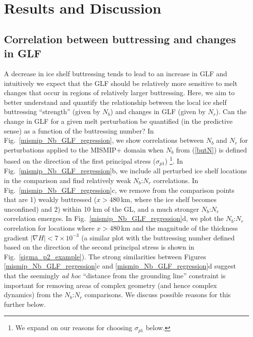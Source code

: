 \documentclass[tc, manuscript]{copernicus}
\begin{document}
\section{Results and Discussion}

\subsection{Correlation between buttressing and changes in GLF}

A decrease in ice shelf buttressing tends to lead to an increase in GLF \citep[e.g.,][]{gagliardini2010} and intuitively we expect that the GLF should be relatively more sensitive to melt changes that occur in regions of relatively larger buttressing. Here, we aim to better understand and quantify the relationship between the local ice shelf buttressing ``strength'' (given by $N_b$) and changes in GLF (given by $N_r$). Can the change in GLF for a given melt perturbation be quantified (in the predictive sense) as a function of the buttressing number? In Fig.~\ref{mismip_Nb_GLF_regression}, we show correlations between $N_b$ and $N_r$ for perturbations applied to the MISMIP+ domain when $N_b$ from (\ref{butN}) is defined based on the direction of the first principal stress ($\sigma_{p1}$) \footnote{We expand on our reasons for choosing $\sigma_{p1}$ below.}. In Fig.~\ref{mismip_Nb_GLF_regression}b, we include all perturbed ice shelf locations in the comparison and find relatively weak $N_b$:$N_r$ correlations. In Fig.~\ref{mismip_Nb_GLF_regression}c, we remove from the comparison points that are 1) weakly buttressed ($x>480$\,km, where the ice shelf becomes unconfined) and 2) within 10 km of the GL, and a much stronger $N_b$:$N_r$ correlation emerges. In Fig.~\ref{mismip_Nb_GLF_regression}d, we plot the $N_b$:$N_r$ correlation for locations where $x>480$\,km and the magnitude of the thickness gradient $\left|\nabla H\right|<7\times 10^{-3}$ (a similar plot with the buttressing number defined based on the direction of the second principal stress is shown in Fig.~\ref{sigma_p2_example}). The strong similarities between Figures \ref{mismip_Nb_GLF_regression}c and \ref{mismip_Nb_GLF_regression}d suggest that the seemingly \textit{ad hoc} ``distance from the grounding line'' constraint is important for removing areas of complex geometry (and hence complex dynamics) from the $N_b$:$N_r$ comparisons. We discuss possible reasons for this further below.
\end{document}
